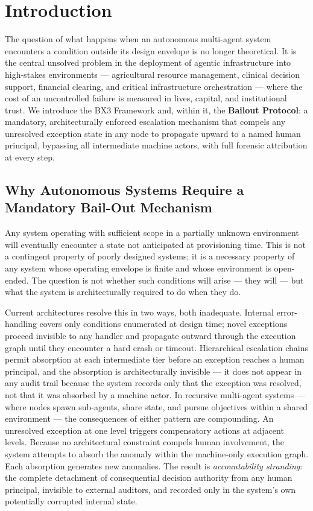 \documentclass{article}
\providecommand{\bxthree}{BX3}
\begin{document}
\section{Introduction}

The question of what happens when an autonomous multi-agent system encounters a condition outside its design envelope is no longer theoretical. It is the central unsolved problem in the deployment of agentic infrastructure into high-stakes environments — agricultural resource management, clinical decision support, financial clearing, and critical infrastructure orchestration — where the cost of an uncontrolled failure is measured in lives, capital, and institutional trust. We introduce the \bxthree{} Framework and, within it, the \textbf{Bailout Protocol}: a mandatory, architecturally enforced escalation mechanism that compels any unresolved exception state in any node to propagate upward to a named human principal, bypassing all intermediate machine actors, with full forensic attribution at every step.

\subsection{Why Autonomous Systems Require a Mandatory Bail-Out Mechanism}

Any system operating with sufficient scope in a partially unknown environment will eventually encounter a state not anticipated at provisioning time. This is not a contingent property of poorly designed systems; it is a necessary property of any system whose operating envelope is finite and whose environment is open-ended. The question is not whether such conditions will arise — they will — but what the system is architecturally required to do when they do.

Current architectures resolve this in two ways, both inadequate. Internal error-handling covers only conditions enumerated at design time; novel exceptions proceed invisible to any handler and propagate outward through the execution graph until they encounter a hard crash or timeout. Hierarchical escalation chains permit absorption at each intermediate tier before an exception reaches a human principal, and the absorption is architecturally invisible — it does not appear in any audit trail because the system records only that the exception was resolved, not that it was absorbed by a machine actor. In recursive multi-agent systems — where nodes spawn sub-agents, share state, and pursue objectives within a shared environment — the consequences of either pattern are compounding. An unresolved exception at one level triggers compensatory actions at adjacent levels. Because no architectural constraint compels human involvement, the system attempts to absorb the anomaly within the machine-only execution graph. Each absorption generates new anomalies. The result is \textit{accountability stranding}: the complete detachment of consequential decision authority from any human principal, invisible to external auditors, and recorded only in the system's own potentially corrupted internal state.
\end{document}
